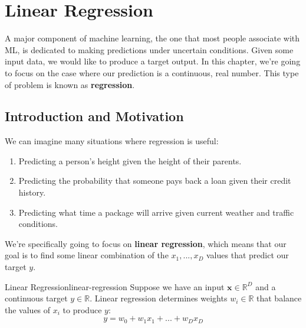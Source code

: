 \chapter{Linear Regression}
A major component of machine learning, the one that most people associate with ML, is dedicated to making predictions under uncertain conditions. Given some input data, we would like to produce a target output. In this chapter, we're going to focus on the case where our prediction is a continuous, real number. This type of problem is known as \textbf{regression}.

\section{Introduction and Motivation}
We can imagine many situations where regression is useful:
\begin{enumerate}
    \item Predicting a person's height given the height of their parents.
    \item Predicting the probability that someone pays back a loan given their credit history.
    \item Predicting what time a package will arrive given current weather and traffic conditions.
\end{enumerate}

We're specifically going to focus on \textbf{linear regression}, which means that our goal is to find some linear combination of the $x_{1}, ..., x_{D}$ values that predict our target $y$.

\begin{definition}{Linear Regression}{linear-regression}
Suppose we have an input $\textbf{x}\in\mathbb{R}^D$ and a continuous target $y\in\mathbb{R}$.
Linear regression determines weights $w_{i}\in\mathbb{R}$ that balance the values of $x_{i}$ to produce $y$:
\begin{equation}
    y = w_{0} + w_{1}x_{1} + ... + w_{D}x_{D}
\end{equation}

\end{definition}


